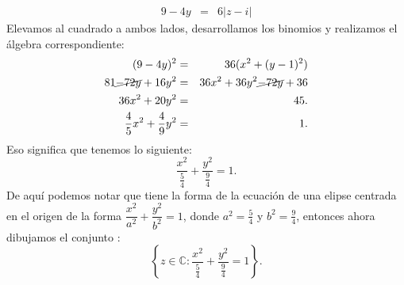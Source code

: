 \documentclass[twoside]{book}
\renewcommand{\Re}{\,\operatorname{Re}\,}
\renewcommand{\Im}{\,\operatorname{Im}\,}
\begin{document}
\begin{sol2}
\begin{solucion}{}
\begin{enumerate}[label=\textsl{(\alph*)}]
\begin{eqnarray*}
                      9-4y&=&6|z-i|
                  \end{eqnarray*}
                  \newpage Elevamos al cuadrado a ambos lados, desarrollamos los binomios y realizamos el \'algebra correspondiente:
                  \begin{eqnarray*}
                      (9-4y)^2&=&36(x^2+(y-1)^2)\\
                      81\cancel{-72y}+16y^2&=&36x^2+36y^2\cancel{-72y}+36\\
                      36x^2+20y^2&=&45.\\
                      \frac{4}{5}x^2+\frac{4}{9}y^2&=&1.
                  \end{eqnarray*}
                  Eso significa que tenemos lo siguiente:
                  $$\dfrac{x^2}{\frac{5}{4}}+\dfrac{y^2}{\frac{9}{4}}=1.$$
                  De aqu\'i podemos notar que tiene la forma de la ecuaci\'on de una elipse centrada en el origen de la forma $\dfrac{x^2}{a^2}+\dfrac{y^2}{b^2}=1$, donde $a^2=\frac{5}{4}$ y $b^2=\frac{9}{4}$, entonces ahora dibujamos el conjunto :
                  $$\left\{z\in\mathbb{C}:\frac{x^2}{\frac{5}{4}}+\frac{y^2}{\frac{9}{4}}=1\right\}.$$
\end{enumerate}
\end{solucion}
\end{sol2}
\end{document}
